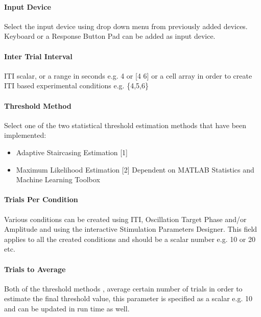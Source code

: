 \documentclass[letterpaper,10pt,english]{sphinxmanual}
\begin{document}
\paragraph{Input Device}
\label{\detokenize{15_SensoryThresholdHunting:input-device}}
\sphinxAtStartPar
Select the input device using drop down menu from previously added devices. Keyboard or a Response Button Pad can be added as input device.


\paragraph{Inter Trial Interval}
\label{\detokenize{15_SensoryThresholdHunting:inter-trial-interval}}
\sphinxAtStartPar
ITI scalar, or a range in seconds e.g. 4 or {[}4 6{]} or a cell array in order to create ITI based experimental conditions e.g. \{4,5,6\}


\paragraph{Threshold Method}
\label{\detokenize{15_SensoryThresholdHunting:threshold-method}}
\sphinxAtStartPar
Select one of the two statistical threshold estimation methods that have been implemented:
\begin{itemize}
\item {} 
\sphinxAtStartPar
Adaptive Staircasing Estimation {[}1{]}

\item {} 
\sphinxAtStartPar
Maximum Likelihood Estimation {[}2{]} \textendash{} Dependent on MATLAB Statistics and Machine Learning Toolbox

\end{itemize}


\paragraph{Trials Per Condition}
\label{\detokenize{15_SensoryThresholdHunting:trials-per-condition}}
\sphinxAtStartPar
Various conditions can be created using ITI, Oscillation Target Phase and/or Amplitude and using the interactive Stimulation Parameters Designer. This field applies to all the created conditions and should be a scalar number e.g. 10 or 20 etc.


\paragraph{Trials to Average}
\label{\detokenize{15_SensoryThresholdHunting:trials-to-average}}
\sphinxAtStartPar
Both of the threshold methods , average certain number of trials in order to estimate the final threshold value, this parameter is specified as a scalar e.g. 10 and can be updated in run time as well.
\end{document}
